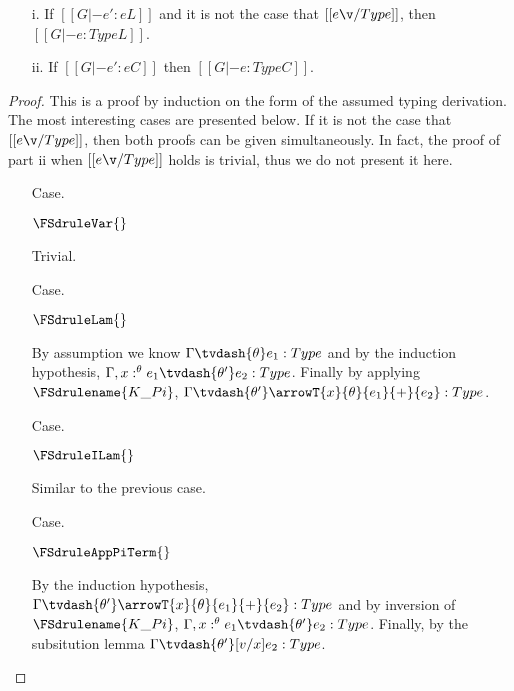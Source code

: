 \begin{lemma}[Regularity]
  \label{lemma:regularity}
  \begin{itemize}
  \item[i.] If $[[G |- e':e L]]$ and it is not the case that $[[e \v/ Type]]$, then $[[G |- e:Type L]]$.
  \item[ii.] If $[[G |- e':e C]]$ then $[[G |- e:Type C]]$.
  \end{itemize}
\end{lemma}
\begin{proof}
  This is a proof by induction on the form of the assumed typing
  derivation.  The most interesting cases are presented below.  If it
  is not the case that $[[e \v/ Type]]$, then both proofs can be given
  simultaneously.  In fact, the proof of part ii when $[[e \v/ Type]]$
  holds is trivial, thus we do not present it here.
  
  \begin{itemize}
  \item[Case.] \ \\
    \begin{center}
      $\FSdruleVar{}$
    \end{center}
    Trivial.

  \item[Case.] \ \\
    \begin{center}
      $\FSdruleLam{}$
    \end{center}
    By assumption we know $\Gamma \tvdash{\theta} e_1:Type$ and by the induction hypothesis,
    $\Gamma,x:^\theta e_1 \tvdash{\theta'} e_2:Type$. Finally by applying 
    $\FSdrulename{K\_Pi}$, $\Gamma \tvdash{\theta'} \arrowT{x}{\theta}{e_1}{+}{e_2}:Type$.

  \item[Case.] \ \\
    \begin{center}
      $\FSdruleILam{}$
    \end{center}
    Similar to the previous case.

  \item[Case.] \ \\
    \begin{center}
      $\FSdruleAppPiTerm{}$
    \end{center}
    By the induction hypothesis, $\Gamma \tvdash{\theta'} \arrowT{x}{\theta}{e_1}{+}{e_2}:Type$
    and by inversion of $\FSdrulename{K\_Pi}$, $\Gamma, x:^\theta e_1 \tvdash{\theta'} e_2:Type$.
    Finally, by the subsitution lemma $\Gamma \tvdash{\theta'} [v/x]e_2:Type$.


\end{itemize}
\end{proof}
